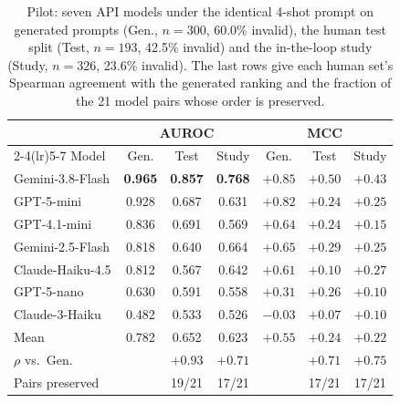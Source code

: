 \documentclass{article} %
\begin{document}
\begin{table}[H]
\caption{Pilot: seven API models under the identical 4-shot prompt on generated prompts (Gen., $n=300$, 60.0\% invalid), the human test split (Test, $n=193$, 42.5\% invalid) and the in-the-loop study (Study, $n=326$, 23.6\% invalid). The last rows give each human set's Spearman agreement with the generated ranking and the fraction of the 21 model pairs whose order is preserved.}
\label{tab:api}
\begin{center}
\small
\begin{tabular}{lcccccc}
\toprule
 & \multicolumn{3}{c}{AUROC} & \multicolumn{3}{c}{MCC} \\
\cmidrule(lr){2-4}\cmidrule(lr){5-7}
Model & Gen. & Test & Study & Gen. & Test & Study \\
\midrule
Gemini-3.8-Flash & \textbf{0.965} & \textbf{0.857} & \textbf{0.768} & $+0.85$ & $+0.50$ & $+0.43$ \\
GPT-5-mini & 0.928 & 0.687 & 0.631 & $+0.82$ & $+0.24$ & $+0.25$ \\
GPT-4.1-mini & 0.836 & 0.691 & 0.569 & $+0.64$ & $+0.24$ & $+0.15$ \\
Gemini-2.5-Flash & 0.818 & 0.640 & 0.664 & $+0.65$ & $+0.29$ & $+0.25$ \\
Claude-Haiku-4.5 & 0.812 & 0.567 & 0.642 & $+0.61$ & $+0.10$ & $+0.27$ \\
GPT-5-nano & 0.630 & 0.591 & 0.558 & $+0.31$ & $+0.26$ & $+0.10$ \\
Claude-3-Haiku & 0.482 & 0.533 & 0.526 & $-0.03$ & $+0.07$ & $+0.10$ \\
\midrule
Mean & 0.782 & 0.652 & 0.623 & $+0.55$ & $+0.24$ & $+0.22$ \\
$\rho$ vs.\ Gen. & & $+0.93$ & $+0.71$ & & $+0.71$ & $+0.75$ \\
Pairs preserved & & 19/21 & 17/21 & & 17/21 & 17/21 \\
\bottomrule
\end{tabular}
\end{center}
\end{table}
\end{document}
